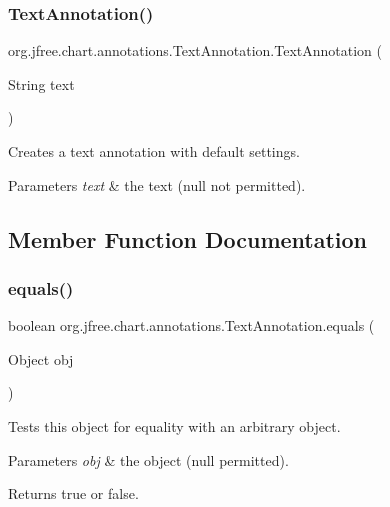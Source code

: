 \subsubsection{\texorpdfstring{Text\+Annotation()}{TextAnnotation()}}
{\footnotesize\ttfamily org.\+jfree.\+chart.\+annotations.\+Text\+Annotation.\+Text\+Annotation (\begin{DoxyParamCaption}\item[{String}]{text }\end{DoxyParamCaption})\hspace{0.3cm}{\ttfamily [protected]}}

Creates a text annotation with default settings.


\begin{DoxyParams}{Parameters}
{\em text} & the text ({\ttfamily null} not permitted). \\
\hline
\end{DoxyParams}


\subsection{Member Function Documentation}
\mbox{\label{classorg_1_1jfree_1_1chart_1_1annotations_1_1_text_annotation_a5f6d8925c32861cc5798ad3d0bebcf59}} 
\subsubsection{\texorpdfstring{equals()}{equals()}}
{\footnotesize\ttfamily boolean org.\+jfree.\+chart.\+annotations.\+Text\+Annotation.\+equals (\begin{DoxyParamCaption}\item[{Object}]{obj }\end{DoxyParamCaption})}

Tests this object for equality with an arbitrary object.


\begin{DoxyParams}{Parameters}
{\em obj} & the object ({\ttfamily null} permitted).\\
\hline
\end{DoxyParams}
\begin{DoxyReturn}{Returns}
{\ttfamily true} or {\ttfamily false}. 
\end{DoxyReturn}
\mbox{\label{classorg_1_1jfree_1_1chart_1_1annotations_1_1_text_annotation_aea2ca0640ab40720ec3610f5422b137c}} 

